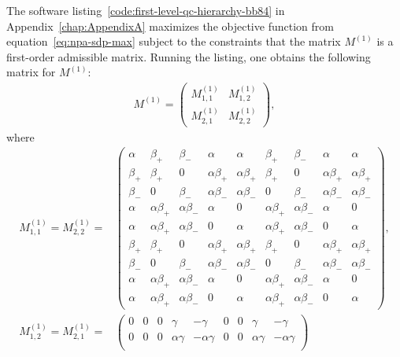 The software listing~\ref{code:first-level-qc-hierarchy-bb84} in Appendix~\ref{chap:AppendixA} maximizes the objective function from equation~\eqref{eq:npa-sdp-max} subject to the constraints that the matrix $M^{(1)}$ is a first-order admissible matrix. Running the listing, one obtains the following matrix for $M^{(1)}$:
\begin{align}
	M^{(1)} = \begin{pmatrix}
				M^{(1)}_{1,1} & M^{(1)}_{1,2} \\[2mm]
				M^{(1)}_{2,1} & M^{(1)}_{2,2}
			  \end{pmatrix},
\end{align}
where 
\begin{equation}
	\begin{aligned}
	M^{(1)}_{1,1} = M^{(1)}_{2,2} =& \begin{pmatrix} \alpha & \beta_+ & \beta_- & \alpha & \alpha & \beta_+ & \beta_- & \alpha & \alpha \\
													\beta_+ & \beta_+ & 0 & \alpha\beta_+ & \alpha\beta_+ & \beta_+ & 0 & \alpha\beta_+ & \alpha \beta_+ \\														\beta_- & 0 & \beta_- & \alpha \beta_- & \alpha \beta_- & 0 & \beta_- & \alpha \beta_- & \alpha \beta_- \\
													\alpha & \alpha \beta_+ & \alpha \beta_- & \alpha & 0 & \alpha \beta_+ & \alpha \beta_- & \alpha & 0 \\
													\alpha & \alpha \beta_+ & \alpha \beta_- & 0 & \alpha & \alpha \beta_+ & \alpha \beta_- & 0 & \alpha \\
													\beta_+ & \beta_+ & 0 & \alpha \beta_+ & \alpha \beta_+ & \beta_+ & 0 & \alpha \beta_+ & \alpha \beta_+ \\
													\beta_- & 0 & \beta_- & \alpha \beta_- & \alpha \beta_- & 0 & \beta_- & \alpha \beta_- & \alpha \beta_- \\
													\alpha & \alpha \beta_+ & \alpha \beta_- & \alpha & 0 & \alpha \beta_+ & \alpha \beta_- & \alpha & 0 \\
													\alpha & \alpha \beta_+ & \alpha \beta_- & 0 & \alpha & \alpha \beta_+ & \alpha \beta_- & 0 & \alpha			
						\end{pmatrix}, \\
	M^{(1)}_{1,2} = M^{(1)}_{2,1} =& \begin{pmatrix} 
										0 & 0 & 0 & \gamma & -\gamma & 0 & 0 & \gamma & -\gamma \\
								0 & 0 & 0 & \alpha \gamma & -\alpha \gamma & 0 & 0 & \alpha \gamma & -\alpha \gamma \\

\end{pmatrix}
\end{aligned}
\end{equation}
